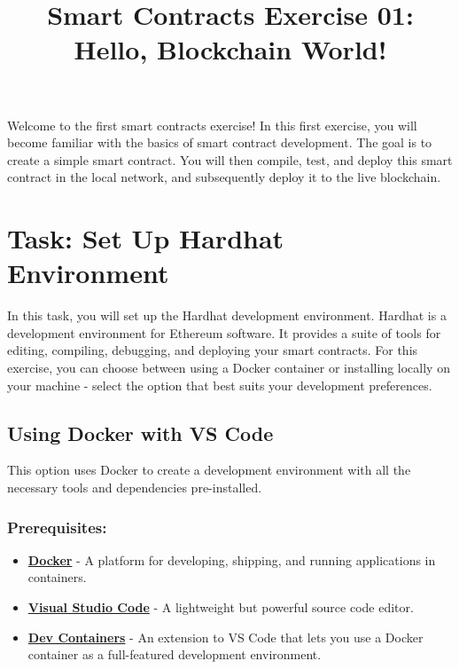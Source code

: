 \documentclass[12pt]{article}
\title{Smart Contracts Exercise 01: \\ Hello, Blockchain World!}
\author{}
\date{}
\begin{document}
\maketitle
\noindent
Welcome to the first smart contracts exercise! In this first exercise, you will become familiar with the basics of smart contract development. The goal is to create a simple smart contract. You will then compile, test, and deploy this smart contract in the local network, and subsequently deploy it to the live blockchain.

\section{Task: Set Up Hardhat Environment}

In this task, you will set up the Hardhat development environment. Hardhat is a development environment for Ethereum software. It provides a suite of tools for editing, compiling, debugging, and deploying your smart contracts. For this exercise, you can choose between using a Docker container or installing locally on your machine - select the option that best suits your development preferences.

\subsection{Using Docker with VS Code}

This option uses Docker to create a development environment with all the necessary tools and dependencies pre-installed.

\subsubsection*{Prerequisites:}

\begin{itemize}
    \item \textbf{\href{https://www.docker.com/products/docker-desktop}{Docker}} - A platform for developing, shipping, and running applications in containers.
    \item \textbf{\href{https://code.visualstudio.com/}{Visual Studio Code}} - A lightweight but powerful source code editor.
    \item \textbf{\href{https://marketplace.visualstudio.com/items?itemName=ms-vscode-remote.remote-containers}{Dev Containers}} - An extension to VS Code that lets you use a Docker container as a full-featured development environment.
\end{itemize}
\end{document}
